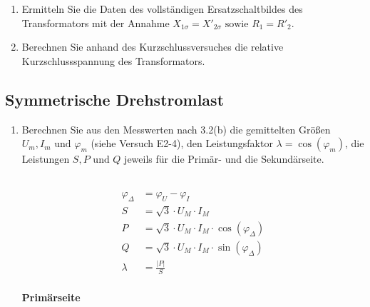 \begin{enumerate}[label=\alph*)]
	\item Ermitteln Sie die Daten des vollständigen Ersatzschaltbildes des Transformators
	      mit der Annahme $X_{1\sigma} = X'_{2\sigma} \text{ sowie } R_1 = R'_2$.

	\item Berechnen Sie anhand des Kurzschlussversuches die relative Kurzschlussspannung
	      des Transformators.

\end{enumerate}
\subsection{Symmetrische Drehstromlast}
\begin{enumerate}[label=\alph*)]

	\item Berechnen Sie aus den Messwerten nach 3.2(b) die gemittelten Größen $U_m, I_m
		      \text{ und } \varphi_m$ (siehe Versuch E2-4), den Leistungsfaktor $\lambda =
		      \cos(\varphi_m)$, die Leistungen $S, P \text{ und } Q$ jeweils für die Primär-
	      und die Sekundärseite.\\ \ \\
	      \begin{center}
		      \begin{align*}
			      \varphi_{\Delta} & = \varphi_{U} - \varphi_{I}                             \\
			      S                & = \sqrt{3}\cdot U_M\cdot I_M                            \\
			      P                & = \sqrt{3}\cdot U_M\cdot I_M\cdot\cos(\varphi_{\Delta}) \\
			      Q                & = \sqrt{3}\cdot U_M\cdot I_M\cdot\sin(\varphi_{\Delta}) \\
			      \lambda          & = \frac{|P|}{S}                                         \\
		      \end{align*}
	      \end{center}

	      \textbf{Primärseite}\\ \ \\

	      \begin{tcolorbox}[colback=gray!30,
			      colframe=black,
			      width=0.9\textwidth,
		      ]
		      \parbox{\textwidth}{

}
\end{tcolorbox}
\end{enumerate}
